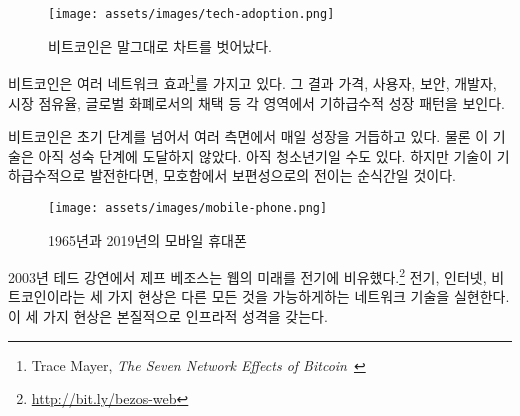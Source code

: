 \begin{figure}
	\texttt{[image: assets/images/tech-adoption.png]}
	\caption{비트코인은 말그대로 차트를 벗어났다.}
	\label{fig:tech-adoption}
\end{figure}

\begin{comment}
	Bitcoin has not one but multiple network effects\footnote{Trace Mayer,
		\textit{The Seven Network Effects of Bitcoin}~\cite{7-network-effects}}, all of
	which resulting in exponential growth patterns in their respective area: price,
	users, security, developers, market share, and adoption as global money.
\end{comment}
비트코인은 여러 네트워크 효과\footnote{Trace Mayer,
	\textit{The Seven Network Effects of Bitcoin}~\cite{7-network-effects}}를 가지고 있다.
그 결과 가격, 사용자, 보안, 개발자, 시장 점유율, 글로벌 화폐로서의 채택 등 각 영역에서 기하급수적 성장 패턴을 보인다.

\begin{comment}
	Having survived its infancy, Bitcoin is continuing to grow every day in
	more aspects than one. Granted, the technology has not reached maturity
	yet. It might be in its adolescence. But if the technology is
	exponential, the path from obscurity to ubiquity is short.
\end{comment}
비트코인은 초기 단계를 넘어서 여러 측면에서 매일 성장을 거듭하고 있다.
물론 이 기술은 아직 성숙 단계에 도달하지 않았다. 아직 청소년기일 수도 있다.
하지만 기술이 기하급수적으로 발전한다면, 모호함에서 보편성으로의 전이는 순식간일 것이다.

\begin{figure}
	\texttt{[image: assets/images/mobile-phone.png]}
	\caption{1965년과 2019년의 모바일 휴대폰}
	\label{fig:mobile-phone}
\end{figure}

\begin{comment}
	In his 2003 TED talk, Jeff Bezos chose to use electricity as a metaphor for the
	web's future.\footnote{\url{http://bit.ly/bezos-web}} All three phenomena ---
	electricity, the internet, Bitcoin --- are \textit{enabling} technologies,
	networks which enable other things. They are infrastructure to be built upon,
	foundational in nature.
\end{comment}
2003년 테드 강연에서 제프 베조스는 웹의 미래를 전기에 비유했다.\footnote{\url{http://bit.ly/bezos-web}}
전기, 인터넷, 비트코인이라는 세 가지 현상은 다른 모든 것을 가능하게하는 네트워크 기술을 실현한다.
이 세 가지 현상은 본질적으로 인프라적 성격을 갖는다.

